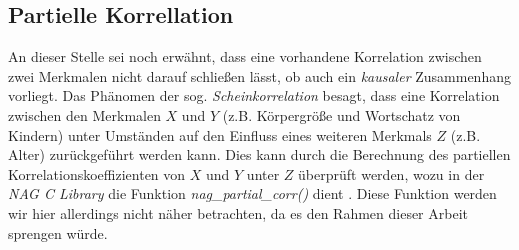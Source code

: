 \subsection{Partielle Korrellation}

An dieser Stelle sei noch erwähnt, dass eine vorhandene Korrelation zwischen zwei Merkmalen nicht darauf schließen lässt, ob auch ein {\it kausaler} Zusammenhang vorliegt. Das Phänomen der sog. {\it Scheinkorrelation} besagt, dass eine Korrelation zwischen den Merkmalen $X$ und $Y$ (z.B. Körpergröße und Wortschatz von Kindern) unter Umständen auf den Einfluss eines weiteren Merkmals $Z$ (z.B. Alter) zurückgeführt werden kann. Dies kann durch die Berechnung des partiellen Korrelationskoeffizienten von $X$ und $Y$ unter $Z$ überprüft werden, wozu in der {\it NAG C Library} die Funktion {\it nag\_partial\_corr()} dient \cite{nag:contents}. Diese Funktion werden wir hier allerdings nicht näher betrachten, da es den Rahmen dieser Arbeit sprengen würde.